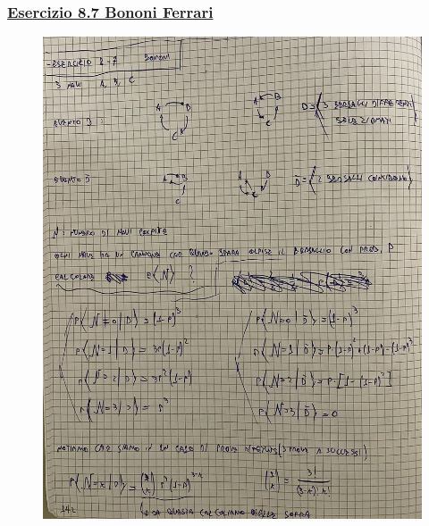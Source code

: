 \documentclass{article}
\begin{document}
\subsubsection{\underline{Esercizio 8.7 Bononi Ferrari}}
\begin{figure}[ht]
\centering
\includegraphics[scale=0.10]{ese/39.jpeg}
\end{figure}
\end{document}
